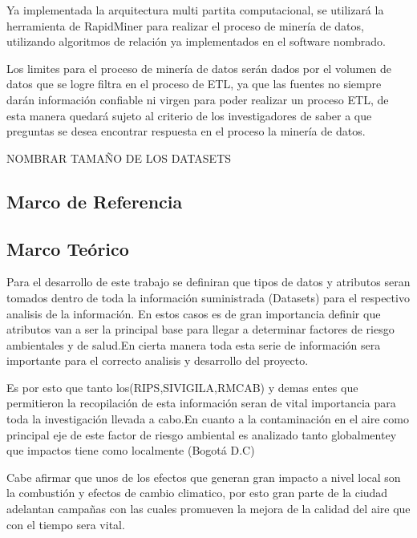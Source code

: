 \documentclass[a4paper, 11pt, oneside]{article}
\theoremstyle{definition}
\theoremstyle{remark}
\begin{document}
Ya implementada la arquitectura multi partita computacional, se utilizará la herramienta de RapidMiner para realizar el proceso de minería de datos, utilizando algoritmos de relación ya implementados en el software nombrado.

Los limites para el proceso de minería de datos serán dados por el volumen de datos que se logre filtra en el proceso de ETL, ya que las fuentes no siempre darán información confiable ni virgen para poder realizar un proceso ETL, de esta manera quedará sujeto al criterio de los investigadores de saber a que preguntas se desea encontrar respuesta en el proceso la minería de datos.

NOMBRAR TAMAÑO DE LOS DATASETS

\clearpage

\begin{center}
 \section{Marco de Referencia}
\end{center}

\subsection{Marco Teórico}
Para el desarrollo de este trabajo se definiran que tipos de datos y atributos seran tomados dentro de toda la información suministrada (Datasets) para el respectivo analisis de la información. En estos casos es de gran importancia definir que atributos van a ser la principal base para llegar a determinar factores de riesgo ambientales y de salud.En cierta manera toda esta serie de información sera importante para el correcto analisis y desarrollo del proyecto.
  
Es por esto que tanto los(RIPS,SIVIGILA,RMCAB) y demas entes que permitieron la recopilación de esta información seran de vital importancia para toda la investigación llevada a cabo.En cuanto a la contaminación en el aire como principal eje de este factor de riesgo ambiental es analizado tanto globalmentey que impactos tiene como localmente (Bogotá D.C)

Cabe afirmar que unos de los efectos que generan gran impacto a nivel local son  la combustión y efectos de cambio climatico, por esto  gran parte de la ciudad adelantan campañas con las cuales promueven la mejora de la calidad del aire que con el tiempo sera vital.
\end{document}
